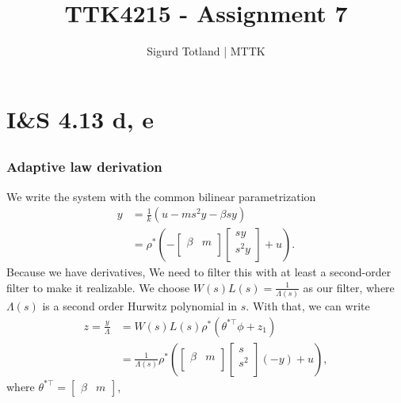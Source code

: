 \documentclass[]{article}
\title{TTK4215 - Assignment 7}
\author{Sigurd Totland | MTTK}
\begin{document}
\maketitle

\section{I\&S 4.13 d, e}
\setcounter{subsection}{3}
\subsection{}
\subsubsection{Adaptive law derivation}
We write the system with the common bilinear parametrization
\begin{equation}\begin{aligned}
y &= \frac{1}{k}(u - ms^2y - \beta sy) \\
&= \rho^* \left(
-\begin{bmatrix}
\beta & m \\
\end{bmatrix}
\begin{bmatrix}
sy\\
s^2y\\
\end{bmatrix}
+ u \right).
\end{aligned}\end{equation}
Because we have derivatives, We need to filter this with at least a second-order filter to make it realizable. We choose $W(s)L(s) = \frac{1}{\Lambda(s)}$ as our filter, where $\Lambda(s)$ is a second order Hurwitz polynomial in $s$. With that, we can write
\begin{equation}\begin{aligned}
z = \frac{y}{\Lambda}
&= W(s)L(s) \rho^* (\theta^{*\top}\phi + z_1) \\
 &= \frac{1}{\Lambda(s)} \rho^*
\left(
\begin{bmatrix}
\beta & m \\
\end{bmatrix}
\begin{bmatrix}
s\\
s^2\\
\end{bmatrix}
(-y)
+ u \right),
\end{aligned}\end{equation}
where $\theta^{* \top} = \begin{bmatrix} \beta & m \end{bmatrix}$,
\end{document}
